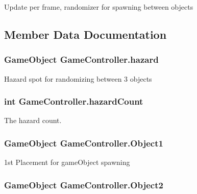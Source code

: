 Update per frame, randomizer for spawning between objects 



\subsection{Member Data Documentation}
\hypertarget{classGameController_a77c185a594a084fe342e8de517808654}{
\subsubsection[{hazard}]{\setlength{\rightskip}{0pt plus 5cm}Game\-Object Game\-Controller.\-hazard}}\label{classGameController_a77c185a594a084fe342e8de517808654}


Hazard spot for randomizing between 3 objects 

\hypertarget{classGameController_a973f0e7d25e3b260cf0aa51730584ada}{
\subsubsection[{hazard\-Count}]{\setlength{\rightskip}{0pt plus 5cm}int Game\-Controller.\-hazard\-Count}}\label{classGameController_a973f0e7d25e3b260cf0aa51730584ada}


The hazard count. 

\hypertarget{classGameController_ae2d31db5ff00946e41b2dcd7ddda941a}{
\subsubsection[{Object1}]{\setlength{\rightskip}{0pt plus 5cm}Game\-Object Game\-Controller.\-Object1}}\label{classGameController_ae2d31db5ff00946e41b2dcd7ddda941a}


1st Placement for game\-Object spawning 

\hypertarget{classGameController_ab5c9311e9997c3d8a34833b3760f28f8}{
\subsubsection[{Object2}]{\setlength{\rightskip}{0pt plus 5cm}Game\-Object Game\-Controller.\-Object2}}\label{classGameController_ab5c9311e9997c3d8a34833b3760f28f8}


